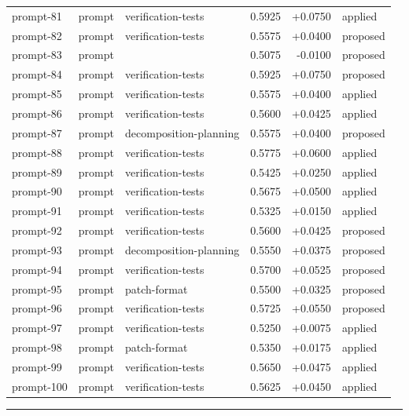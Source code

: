 \begin{center}
\begin{longtable}{llp{5.2cm}rrl}
prompt-81 & prompt & verification-tests & 0.5925 & +0.0750 & applied \\
prompt-82 & prompt & verification-tests & 0.5575 & +0.0400 & proposed \\
prompt-83 & prompt &  & 0.5075 & -0.0100 & proposed \\
prompt-84 & prompt & verification-tests & 0.5925 & +0.0750 & proposed \\
prompt-85 & prompt & verification-tests & 0.5575 & +0.0400 & applied \\
prompt-86 & prompt & verification-tests & 0.5600 & +0.0425 & applied \\
prompt-87 & prompt & decomposition-planning & 0.5575 & +0.0400 & proposed \\
prompt-88 & prompt & verification-tests & 0.5775 & +0.0600 & applied \\
prompt-89 & prompt & verification-tests & 0.5425 & +0.0250 & applied \\
prompt-90 & prompt & verification-tests & 0.5675 & +0.0500 & applied \\
prompt-91 & prompt & verification-tests & 0.5325 & +0.0150 & applied \\
prompt-92 & prompt & verification-tests & 0.5600 & +0.0425 & proposed \\
prompt-93 & prompt & decomposition-planning & 0.5550 & +0.0375 & proposed \\
prompt-94 & prompt & verification-tests & 0.5700 & +0.0525 & proposed \\
prompt-95 & prompt & patch-format & 0.5500 & +0.0325 & proposed \\
prompt-96 & prompt & verification-tests & 0.5725 & +0.0550 & proposed \\
prompt-97 & prompt & verification-tests & 0.5250 & +0.0075 & applied \\
prompt-98 & prompt & patch-format & 0.5350 & +0.0175 & applied \\
prompt-99 & prompt & verification-tests & 0.5650 & +0.0475 & applied \\
prompt-100 & prompt & verification-tests & 0.5625 & +0.0450 & applied \\
\bottomrule\end{longtable}\end{center}
\par\bigskip\hrule\bigskip
